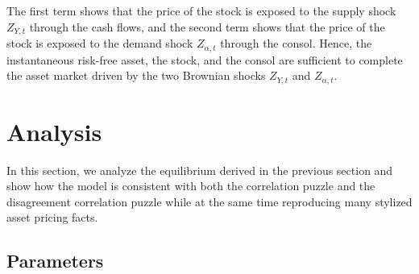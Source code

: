 \documentclass[preprint,11pt,authoryear]{elsarticle}
\theoremstyle{plain}
\begin{document}
 
The first term shows that the price of the stock is exposed to the supply shock $Z_{Y,t}$ through the cash flows, and the second term shows that the price of the stock is exposed to the demand shock $Z_{\alpha,t}$ through the consol. Hence, the instantaneous risk-free asset, the stock, and the consol are sufficient to complete the asset market driven by the two Brownian shocks $Z_{Y,t}$ and $Z_{\alpha,t}$. 


\section{Analysis} \label{sec:analysis}

In this section, we analyze the equilibrium derived in the previous section and show how the model is consistent with both the correlation puzzle and the disagreement correlation puzzle while at the same time reproducing many stylized asset pricing facts.

\subsection{Parameters}
\end{document}
